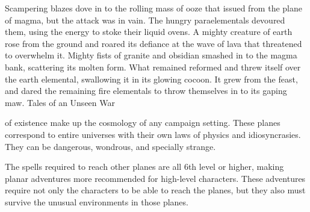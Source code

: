 {Scampering blazes dove in to the rolling mass of ooze that issued from the plane of magma, but the attack was in vain. The hungry paraelementals devoured them, using the energy to stoke their liquid ovens. A mighty creature of earth rose from the ground and roared its defiance at the wave of lava that threatened to overwhelm it. Mighty fists of granite and obsidian smashed in to the magma bank, scattering its molten form. What remained reformed and threw itself over the earth elemental, swallowing it in its glowing cocoon. It grew from the feast, and dared the remaining fire elementals to throw themselves in to its gaping maw.}
{Tales of an Unseen War}

 of existence make up the cosmology of any campaign setting. These planes correspond to entire universes with their own laws of physics and idiosyncrasies. They can be dangerous, wondrous, and specially strange.

The spells required to reach other planes are all 6th level or higher, making planar adventures more recommended for high-level characters. These adventures require not only the characters to be able to reach the planes, but they also must survive the unusual environments in those planes.







% 
